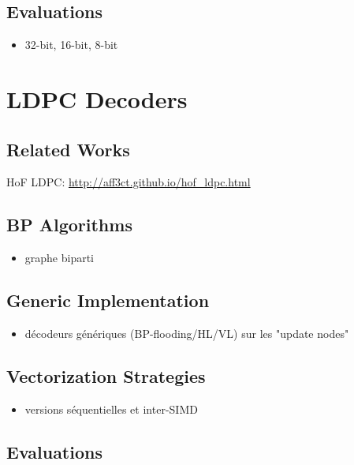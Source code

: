 \subsection{Evaluations}

\begin{itemize}
  \item 32-bit, 16-bit, 8-bit
\end{itemize}

\section{LDPC Decoders}

\subsection{Related Works}

HoF LDPC: \url{http://aff3ct.github.io/hof_ldpc.html}

\subsection{BP Algorithms}

\begin{itemize}
  \item graphe biparti
\end{itemize}

\subsection{Generic Implementation}

\begin{itemize}
  \item décodeurs génériques (BP-flooding/HL/VL) sur les "update nodes"
\end{itemize}

\subsection{Vectorization Strategies}

\begin{itemize}
  \item versions séquentielles et inter-SIMD
\end{itemize}

\subsection{Evaluations}

